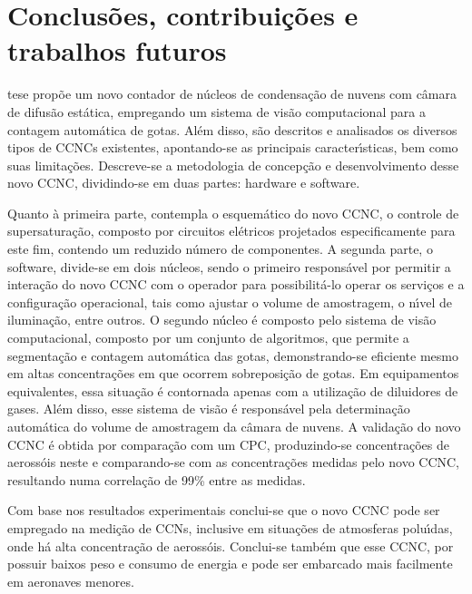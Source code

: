 \doublespacing

\chapter{Conclus\~{o}es, contribui\c{c}\~{o}es e trabalhos futuros}
\label{cap:conclus\~{o}es}

 tese prop\~{o}e um novo contador de n\'{u}cleos de condensa\c{c}\~{a}o de nuvens com c\^{a}mara de difus\~{a}o est\'{a}tica, empregando um sistema de vis\~{a}o computacional para a contagem autom\'{a}tica de gotas. Al\'{e}m disso, s\~{a}o descritos e analisados os diversos tipos de CCNCs existentes, apontando-se as principais caracter\'{\i}sticas, bem como suas limita\c{c}\~{o}es. Descreve-se a metodologia de concep\c{c}\~{a}o e desenvolvimento desse novo CCNC, dividindo-se em duas partes: hardware e software.

Quanto \`{a} primeira parte, contempla o esquem\'{a}tico do novo CCNC, o controle de supersatura\c{c}\~{a}o, composto por circuitos el\'{e}tricos projetados especificamente para este fim, contendo um reduzido n\'{u}mero de componentes. A segunda parte, o software, divide-se em dois n\'{u}cleos, sendo o primeiro respons\'{a}vel por permitir a intera\c{c}\~{a}o do novo CCNC com o operador para possibilit\'{a}-lo operar os servi\c{c}os e a configura\c{c}\~{a}o operacional, tais como ajustar o volume de amostragem, o n\'{\i}vel de ilumina\c{c}\~{a}o, entre outros.  O segundo n\'{u}cleo \'{e} composto pelo sistema de vis\~{a}o computacional, composto por um conjunto de algoritmos, que permite a segmenta\c{c}\~{a}o e contagem autom\'{a}tica das gotas, demonstrando-se eficiente mesmo em altas concentra\c{c}\~{o}es em que ocorrem sobreposi\c{c}\~{a}o de gotas. Em equipamentos equivalentes, essa situa\c{c}\~{a}o \'{e} contornada apenas com a utiliza\c{c}\~{a}o de diluidores de gases. Al\'{e}m disso, esse sistema de vis\~{a}o \'{e} respons\'{a}vel pela determina\c{c}\~{a}o autom\'{a}tica do volume de amostragem da c\^{a}mara de nuvens.  A valida\c{c}\~{a}o do novo CCNC \'{e} obtida por compara\c{c}\~{a}o com um CPC, produzindo-se concentra\c{c}\~{o}es de aeross\'{o}is neste e comparando-se com as concentra\c{c}\~{o}es medidas pelo novo CCNC, resultando numa correla\c{c}\~{a}o de 99\% entre as medidas.

Com base nos resultados experimentais conclui-se que o novo CCNC pode ser empregado na medi\c{c}\~{a}o de CCNs, inclusive em situa\c{c}\~{o}es de atmosferas polu\'{\i}das, onde h\'{a} alta concentra\c{c}\~{a}o de aeross\'{o}is. Conclui-se tamb\'{e}m que esse CCNC, por possuir baixos peso e consumo de energia e pode ser embarcado mais facilmente em aeronaves menores.
	
